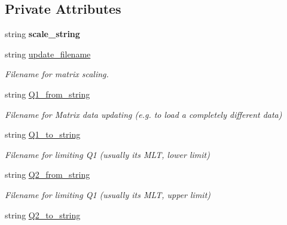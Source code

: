 \subsection*{Private Attributes}
\begin{DoxyCompactItemize}
\item 
\hypertarget{class_updatable_matrix_a5af841b9937ec327b1774a80f5419933}{}string {\bfseries scale\+\_\+string}\label{class_updatable_matrix_a5af841b9937ec327b1774a80f5419933}

\item 
\hypertarget{class_updatable_matrix_a1251811f61cd781c010eb2d80d31afa1}{}string \hyperlink{class_updatable_matrix_a1251811f61cd781c010eb2d80d31afa1}{update\+\_\+filename}\label{class_updatable_matrix_a1251811f61cd781c010eb2d80d31afa1}

\begin{DoxyCompactList}\small\item\em Filename for matrix scaling. \end{DoxyCompactList}\item 
\hypertarget{class_updatable_matrix_aa75594fbb280ca076f76ee92672afe25}{}string \hyperlink{class_updatable_matrix_aa75594fbb280ca076f76ee92672afe25}{Q1\+\_\+from\+\_\+string}\label{class_updatable_matrix_aa75594fbb280ca076f76ee92672afe25}

\begin{DoxyCompactList}\small\item\em Filename for Matrix data updating (e.\+g. to load a completely different data) \end{DoxyCompactList}\item 
\hypertarget{class_updatable_matrix_a65fcb6c628c92fa7c29d887665c2b1b0}{}string \hyperlink{class_updatable_matrix_a65fcb6c628c92fa7c29d887665c2b1b0}{Q1\+\_\+to\+\_\+string}\label{class_updatable_matrix_a65fcb6c628c92fa7c29d887665c2b1b0}

\begin{DoxyCompactList}\small\item\em Filename for limiting Q1 (usually it\textquotesingle{}s M\+L\+T, lower limit) \end{DoxyCompactList}\item 
\hypertarget{class_updatable_matrix_a05ca54f981ebba0c2889eaf6127457d3}{}string \hyperlink{class_updatable_matrix_a05ca54f981ebba0c2889eaf6127457d3}{Q2\+\_\+from\+\_\+string}\label{class_updatable_matrix_a05ca54f981ebba0c2889eaf6127457d3}

\begin{DoxyCompactList}\small\item\em Filename for limiting Q1 (usually it\textquotesingle{}s M\+L\+T, upper limit) \end{DoxyCompactList}\item 
\hypertarget{class_updatable_matrix_a6f6dec0874e2d95f71b9cfc712214bb5}{}string \hyperlink{class_updatable_matrix_a6f6dec0874e2d95f71b9cfc712214bb5}{Q2\+\_\+to\+\_\+string}\label{class_updatable_matrix_a6f6dec0874e2d95f71b9cfc712214bb5}


\end{DoxyCompactItemize}
